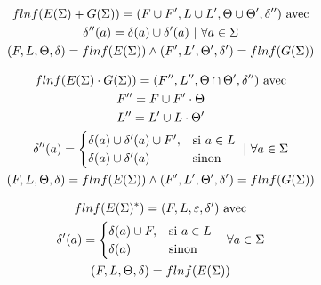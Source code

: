 \begin{gather}
    flnf(E(\Sigma) + G(\Sigma)) = (F \cup F', L \cup L', \Theta \cup \Theta', \delta'')~ \text{avec} \\
    \delta''(a) = \delta(a) \cup \delta'(a) ~|~ \forall a \in \Sigma \notag \\
    (F, L, \Theta, \delta) = flnf(E(\Sigma)) \land (F', L', \Theta', \delta') = flnf(G(\Sigma)) \notag
\end{gather}

\begin{gather}
    flnf(E(\Sigma) \cdot G(\Sigma)) = (F'', L'', \Theta \cap \Theta', \delta'')~ \text{avec} \\
    F'' = F \cup F' \cdot \Theta \notag \\
    L'' = L' \cup L \cdot \Theta' \notag \\
    \delta''(a) = \begin{cases} \delta(a) \cup \delta'(a) \cup F', & \text{si}~ a \in L \\ \delta(a) \cup \delta'(a) & \text{sinon}\end{cases} ~|~ \forall a \in \Sigma\notag \\
    (F, L, \Theta, \delta) = flnf(E(\Sigma)) \land (F', L', \Theta', \delta') = flnf(G(\Sigma)) \notag
\end{gather}

\begin{gather}
    flnf(E(\Sigma)^*) = (F, L, \varepsilon, \delta')~ \text{avec} \\
    \delta'(a) = \begin{cases} \delta(a) \cup F, & \text{si}~ a \in L \\ \delta(a) & \text{sinon}\end{cases} ~|~ \forall a \in \Sigma\notag \\
    (F, L, \Theta, \delta) = flnf(E(\Sigma)) \notag
\end{gather}

